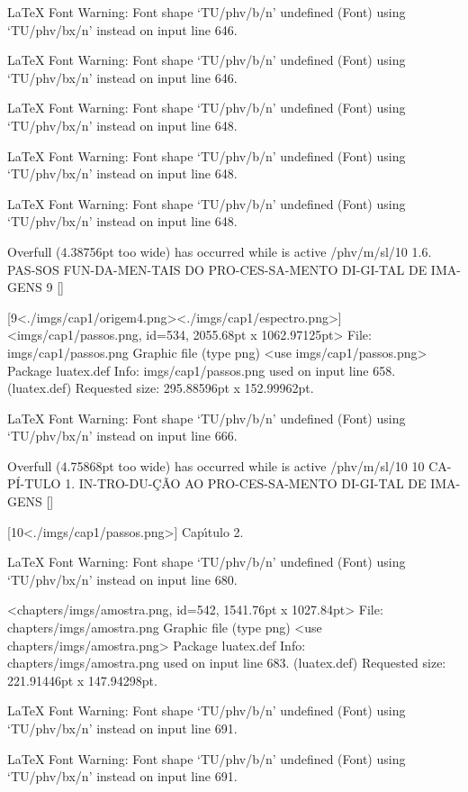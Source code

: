 LaTeX Font Warning: Font shape `TU/phv/b/n' undefined
(Font)              using `TU/phv/bx/n' instead on input line 646.


LaTeX Font Warning: Font shape `TU/phv/b/n' undefined
(Font)              using `TU/phv/bx/n' instead on input line 646.


LaTeX Font Warning: Font shape `TU/phv/b/n' undefined
(Font)              using `TU/phv/bx/n' instead on input line 648.


LaTeX Font Warning: Font shape `TU/phv/b/n' undefined
(Font)              using `TU/phv/bx/n' instead on input line 648.


LaTeX Font Warning: Font shape `TU/phv/b/n' undefined
(Font)              using `TU/phv/bx/n' instead on input line 648.


Overfull \hbox (4.38756pt too wide) has occurred while \output is active
\TU/phv/m/sl/10 1.6.  PAS-SOS FUN-DA-MEN-TAIS DO PRO-CES-SA-MENTO DI-GI-TAL DE IMA-GENS 9
 []

[9<./imgs/cap1/origem4.png><./imgs/cap1/espectro.png>]
<imgs/cap1/passos.png, id=534, 2055.68pt x 1062.97125pt>
File: imgs/cap1/passos.png Graphic file (type png)
<use imgs/cap1/passos.png>
Package luatex.def Info: imgs/cap1/passos.png  used on input line 658.
(luatex.def)             Requested size: 295.88596pt x 152.99962pt.

LaTeX Font Warning: Font shape `TU/phv/b/n' undefined
(Font)              using `TU/phv/bx/n' instead on input line 666.


Overfull \hbox (4.75868pt too wide) has occurred while \output is active
\TU/phv/m/sl/10 10 CA-PÍ-TULO 1.  IN-TRO-DU-ÇÃO AO PRO-CES-SA-MENTO DI-GI-TAL DE IMA-GENS
 []

[10<./imgs/cap1/passos.png>]
Cap\'{\i }tulo 2.

LaTeX Font Warning: Font shape `TU/phv/b/n' undefined
(Font)              using `TU/phv/bx/n' instead on input line 680.

<chapters/imgs/amostra.png, id=542, 1541.76pt x 1027.84pt>
File: chapters/imgs/amostra.png Graphic file (type png)
<use chapters/imgs/amostra.png>
Package luatex.def Info: chapters/imgs/amostra.png  used on input line 683.
(luatex.def)             Requested size: 221.91446pt x 147.94298pt.

LaTeX Font Warning: Font shape `TU/phv/b/n' undefined
(Font)              using `TU/phv/bx/n' instead on input line 691.


LaTeX Font Warning: Font shape `TU/phv/b/n' undefined
(Font)              using `TU/phv/bx/n' instead on input line 691.


